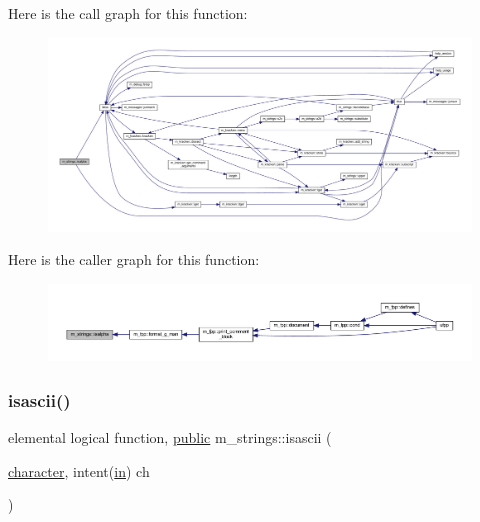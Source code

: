 Here is the call graph for this function\+:
\nopagebreak
\begin{figure}[H]
\begin{center}
\leavevmode
\includegraphics[width=350pt]{namespacem__strings_a5cf6d7fbd1b3ea17e37c6213c6ba0fdb_cgraph}
\end{center}
\end{figure}
Here is the caller graph for this function\+:
\nopagebreak
\begin{figure}[H]
\begin{center}
\leavevmode
\includegraphics[width=350pt]{namespacem__strings_a5cf6d7fbd1b3ea17e37c6213c6ba0fdb_icgraph}
\end{center}
\end{figure}
\mbox{\label{namespacem__strings_afb63e9fefbc04e4e9a2ec4df4334078c}} 
\subsubsection{\texorpdfstring{isascii()}{isascii()}}
{\footnotesize\ttfamily elemental logical function, \hyperlink{M__stopwatch_83_8txt_a2f74811300c361e53b430611a7d1769f}{public} m\+\_\+strings\+::isascii (\begin{DoxyParamCaption}\item[{\hyperlink{option__stopwatch_83_8txt_abd4b21fbbd175834027b5224bfe97e66}{character}, intent(\hyperlink{M__journal_83_8txt_afce72651d1eed785a2132bee863b2f38}{in})}]{ch }\end{DoxyParamCaption})}



